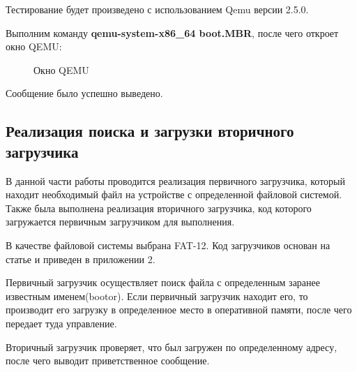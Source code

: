 Тестирование будет произведено с использованием Qemu версии 2.5.0.

Выполним команду \textbf{qemu-system-x86\_64 boot.MBR}, после чего откроет окно QEMU:
\begin{figure}[H]
  \centering
  \caption{Окно QEMU}
\end{figure}
Сообщение было успешно выведено.




\subsection{Реализация поиска и загрузки вторичного загрузчика}
В данной части работы проводится реализация первичного загрузчика, который находит необходимый файл на устройстве с определенной файловой системой. Также была выполнена реализация вторичного загрузчика, код которого загружается первичным загрузчиком для выполнения.

В качестве файловой системы выбрана FAT-12. Код загрузчиков основан на статье\cite{mbr2Guide} и приведен в приложении 2.

Первичный загрузчик осуществляет поиск файла с определенным заранее известным именем(bootor). Если первичный загрузчик находит его, то производит его загрузку в определенное место в оперативной памяти, после чего передает туда управление.

Вторичный загрузчик проверяет, что был загружен по определенному адресу, после чего выводит приветственное сообщение.

